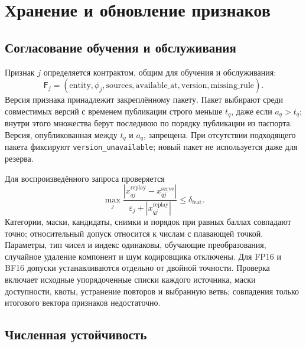 \documentclass[12pt,a4paper]{article}
\newcommand{\code}[1]{{\ttfamily\small\nolinkurl{#1}}}
\newcommand{\eps}{\varepsilon}
\newcommand{\abs}[1]{\left|#1\right|}
\theoremstyle{plainru}
\begin{document}
\section{Хранение и обновление признаков}\label{sec:operations-features}

\subsection{Согласование обучения и обслуживания}

Признак \(j\) определяется контрактом, общим для обучения и обслуживания:
\begin{equation}\label{eq:ops-feature-contract}
\mathsf F_j=(\mathrm{entity},\phi_j,\mathrm{sources},
\mathrm{available\_at},\mathrm{version},\mathrm{missing\_rule}).
\end{equation}
Версия признака принадлежит закреплённому пакету. Пакет выбирают среди
совместимых версий с временем публикации строго меньше $t_q$, даже если
$a_q>t_q$; внутри этого множества берут последнюю по порядку публикации
из паспорта. Версия, опубликованная между $t_q$ и $a_q$, запрещена.
При отсутствии подходящего пакета фиксируют \code{version_unavailable};
новый пакет не используется даже для резерва.

Для воспроизведённого запроса проверяется
\begin{equation}\label{eq:ops-feature-parity}
\max_j\frac{\abs{x^{\mathrm{replay}}_{qj}-x^{\mathrm{serve}}_{qj}}}
{\eps_j+\abs{x^{\mathrm{replay}}_{qj}}}\le\delta_{\mathrm{feat}}.
\end{equation}
Категории, маски, кандидаты, снимки и порядок при равных баллах
совпадают точно; относительный допуск относится к числам с плавающей
точкой. Параметры, тип чисел и индекс одинаковы, обучающие преобразования,
случайное удаление компонент и шум кодировщика отключены.
Для FP16 и BF16 допуски устанавливаются отдельно от двойной точности.
Проверка включает исходные упорядоченные списки каждого источника,
маски доступности, квоты, устранение повторов и выбранную ветвь;
совпадения только итогового вектора признаков недостаточно.

\subsection{Численная устойчивость}\label{sec:ops-numerics}
\end{document}
